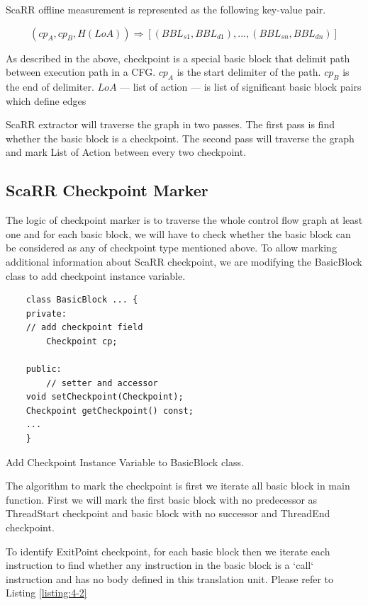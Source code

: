 ScaRR offline measurement is represented as the following key-value pair.

$$(cp_A, cp_B, H(LoA)) \Rightarrow [(BBL_{s1}, BBL_{d1}), ..., (BBL_{sn}, BBL_{dn})]$$

As described in the above, checkpoint is a special basic block that delimit path between execution path in a CFG. $cp_A$ is the start delimiter of the path. $cp_B$ is the end of delimiter. $LoA$ — list of action — is list of significant basic block pairs which define edges 

ScaRR extractor will traverse the graph in two passes. The first pass is find whether the basic block is a checkpoint. The second pass will traverse the graph and mark List of Action between every two checkpoint. 

\subsection{ScaRR Checkpoint Marker}

The logic of checkpoint marker is to traverse the whole control flow graph at least one and for each basic block, we will have to check whether the basic block can be considered as any of checkpoint type mentioned above. To allow marking additional information about ScaRR checkpoint, we are modifying the BasicBlock class to add checkpoint instance variable.

\begin{listing}
\begin{verbatim}
    class BasicBlock ... {
    private:
    // add checkpoint field
        Checkpoint cp;

    public:
        // setter and accessor
    void setCheckpoint(Checkpoint);
    Checkpoint getCheckpoint() const;
    ...
    }
\end{verbatim}
\caption{Add Checkpoint Instance Variable to BasicBlock class.}    
\label{listing:4-1}
\end{listing}

The algorithm to mark the checkpoint is first we iterate all basic block in main function. First we will mark the first basic block with no predecessor as ThreadStart checkpoint and basic block with no successor and ThreadEnd checkpoint. 

To identify ExitPoint checkpoint, for each basic block then we iterate  each instruction to find whether any instruction in the basic block is a `call` instruction and has no body defined in this translation unit. Please refer to Listing \ref{listing:4-2}

